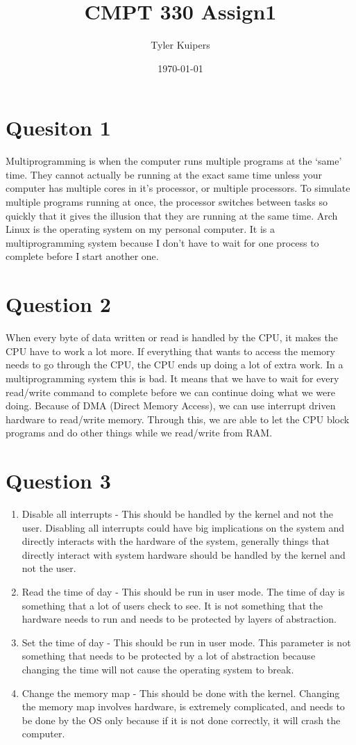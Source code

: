 \documentclass[12pt]{extarticle}
\title{CMPT 330 Assign1}
\author{Tyler Kuipers}
\date{\today}
\begin{document}
	\maketitle

	\section*{Quesiton 1}
		Multiprogramming is when the computer runs multiple programs at the `same' time.  They cannot actually be running at the exact same time unless your computer has multiple cores in it's processor, or multiple processors.  To simulate multiple programs running at once, the processor switches between tasks so quickly that it gives the illusion that they are running at the same time.  Arch Linux is the operating system on my personal computer.  It is a multiprogramming system because I don't have to wait for one process to complete before I start another one.

	\section*{Question 2}
		When every byte of data written or read is handled by the CPU, it makes the CPU have to work a lot more.  If everything that wants to access the memory needs to go through the CPU, the CPU ends up doing a lot of extra work.  In a multiprogramming system this is bad.  It means that we have to wait for every read/write command to complete before we can continue doing what we were doing.  Because of DMA (Direct Memory Access), we can use interrupt driven hardware to read/write memory.  Through this, we are able to let the CPU block programs and do other things while we read/write from RAM.

	\section*{Question 3}  
		\begin{enumerate}
			\item Disable all interrupts - This should be handled by the kernel and not the user.  Disabling all interrupts could have big implications on the system and directly interacts with the hardware of the system, generally things that directly interact with system hardware should be handled by the kernel and not the user.
			\item Read the time of day - This should be run in user mode.  The time of day is something that a lot of users check to see.  It is not something that the hardware needs to run and needs to be protected by layers of abstraction.
			\item Set the time of day - This should be run in user mode.  This parameter is not something that needs to be protected by a lot of abstraction because changing the time will not cause the operating system to break.
			\item Change the memory map - This should be done with the kernel.  Changing the memory map involves hardware, is extremely complicated, and needs to be done by the OS only because if it is not done correctly, it will crash the computer. 
		\end{enumerate}
\end{document}
